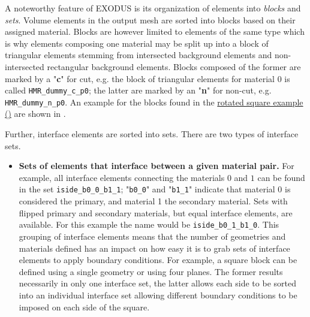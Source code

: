 \vspace{0.2cm}

A noteworthy feature of EXODUS is its organization of elements into \emph{blocks} and \emph{sets}. Volume elements in the output mesh are sorted into blocks based on their assigned material. Blocks are however limited to elements of the same type which is why elements composing one material may be split up into a block of triangular elements stemming from intersected background elements and non-intersected rectangular background elements. Blocks composed of the former are marked by a "\textbf{c}" for cut, e.g. the block of triangular elements for material $0$ is called \texttt{HMR\_dummy\_c\_p0}; the latter are marked by an "\textbf{n}" for non-cut, e.g. \texttt{HMR\_dummy\_n\_p0}. An example for the blocks found in the \href{https://github.com/kkmaute/moris/blob/main/share/doc/mesh_generation/examples/Rotated_Square_Example.xml}{rotated square example (\ExternalLink)} are shown in .

\vspace{1.2cm}

Further, interface elements are sorted into sets. There are two types of interface sets.
\begin{itemize}
    \item \textbf{Sets of elements that interface between a given material pair.} For example, all interface elements connecting the materials $0$ and $1$ can be found in the set \texttt{iside\_b0\_0\_b1\_1}; "\texttt{b0\_0}" and "\texttt{b1\_1}" indicate that material 0 is considered the primary, and material 1 the secondary material. Sets with flipped primary and secondary materials, but equal interface elements, are available. For this example the name would be \texttt{iside\_b0\_1\_b1\_0}. 
    This grouping of interface elements means that the number of geometries and materials defined has an impact on how easy it is to grab sets of interface elements to apply boundary conditions. For example, a square block can be defined using a single geometry or using four planes. The former results necessarily in only one interface set, the latter allows each side to be sorted into an individual interface set allowing different boundary conditions to be imposed on each side of the square.
\end{itemize}

